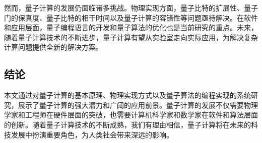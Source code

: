 然而，量子计算的发展仍面临诸多挑战。物理实现方面，量子比特的扩展性、量子门的保真度、量子比特的相干时间以及量子计算的容错性等问题亟待解决。在软件和应用层面，量子编程语言的开发和量子算法的优化也是当前研究的重点。未来，随着量子计算技术的不断进步，量子计算有望从实验室走向实际应用，为解决复杂计算问题提供全新的解决方案。

\subsection{结论}

本文通过对量子计算的基本原理、物理实现方式以及量子算法的编程实现的系统研究，展示了量子计算的强大潜力和广阔的应用前景。量子计算的发展不仅需要物理学家和工程师在硬件层面的突破，也需要计算机科学家和数学家在软件和算法层面的创新。随着量子计算技术的不断成熟，我们有理由相信，量子计算将在未来的科技发展中扮演重要角色，为人类社会带来深远的影响。

